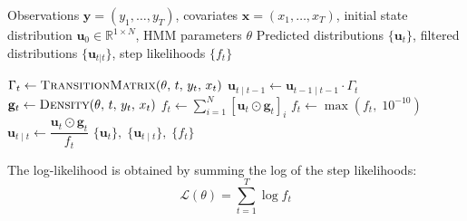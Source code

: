 \begin{algorithm}[H]
\caption{Recursive Filtering Forward Algorithm}
\label{alg:forward}
\begin{algorithmic}[1]
\Require Observations $\mathbf{y} = (y_1, \ldots, y_T)$,
         covariates $\mathbf{x} = (x_1, \ldots, x_T)$,
         initial state distribution $\mathbf{u}_0 \in \mathbb{R}^{1 \times N}$,
         HMM parameters $\theta$
\Ensure Predicted distributions $\{\mathbf{u}_t\}$,
        filtered distributions $\{\mathbf{u}_{t|t}\}$,
        step likelihoods $\{f_t\}$

    \State $\Gamma_t \leftarrow \textsc{TransitionMatrix}(\theta,\, t,\, y_t,\, x_t)$
    \State $\mathbf{u}_{t \mid t - 1} \leftarrow \mathbf{u}_{t-1 \mid t-1} \cdot \Gamma_t$
    \State $\mathbf{g}_t \leftarrow \textsc{Density}(\theta,\, t,\, y_t,\, x_t)$
    \State $f_t \leftarrow \displaystyle\sum_{i=1}^{N} [\mathbf{u}_t \odot \mathbf{g}_t]_i$
    \State $f_t \leftarrow \max(f_t,\; 10^{-10})$
    \State $\mathbf{u}_{t \mid t} \leftarrow \dfrac{\mathbf{u}_t \odot \mathbf{g}_t}{f_t}$
\EndFor
\State \Return $\{\mathbf{u}_t\},\; \{\mathbf{u}_{t \mid t}\},\; \{f_t\}$
\end{algorithmic}
\end{algorithm}

\noindent The log-likelihood is obtained by summing the log of the step likelihoods:
\begin{equation}
    \mathcal{L}(\theta) = \sum_{t=1}^{T} \log f_t
    \label{eq:log_likelihood}
\end{equation}

